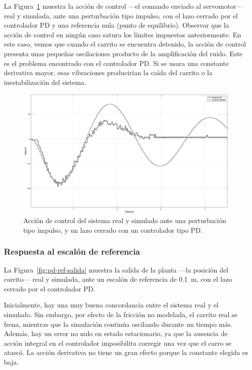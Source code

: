 La Figura~\ref{fig:pd-pert-cont} muestra la acción de control ---el comando enviado al servomotor--- real y simulada, ante una perturbación tipo impulso, con el lazo cerrado por el controlador PD y una referencia nula (punto de equilibrio). Observar que la acción de control en ningún caso satura los límites impuestos anteriormente. En este caso, vemos que cuando el carrito se encuentra detenido, la acción de control presenta unas pequeñas oscilaciones producto de la amplificación del ruido. Este es el problema encontrado con el controlador PD. Si se usara una constante derivativa mayor, esas vibraciones producirían la caída del carrito o la inestabilización del sistema.

\begin{figure}[!tbp]
    \centering
    \includegraphics[width=\linewidth]{img/pd-pert-cont.eps}
    \caption{Acción de control del sistema real y simulado ante una perturbación tipo impulso, y un lazo cerrado con un controlador tipo PD.}
    \label{fig:pd-pert-cont}
\end{figure}

\subsubsection{Respuesta al escalón de referencia}

La Figura~\ref{fig:pd-ref-salida} muestra la salida de la planta ---la posición del carrito--- real y simulada, ante un escalón de referencia de \qty{0.1}{\m}, con el lazo cerrado por el controlador PD.

Inicialmente, hay una muy buena concordancia entre el sistema real y el simulado. Sin embargo, por efecto de la fricción no modelada, el carrito real se frena, mientras que la simulación continúa oscilando durante un tiempo más. Además, hay un error no nulo en estado estacionario, ya que la ausencia de acción integral en el controlador imposibilita corregir una vez que el carro se atascó. La acción derivativa no tiene un gran efecto porque la constante elegida es baja.

